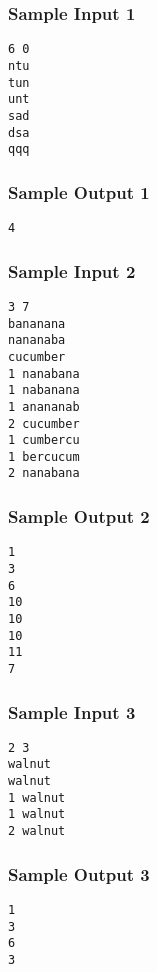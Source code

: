 \subsubsection{Sample Input 1}\label{sample-input-1}
\begin{verbatim}
6 0
ntu
tun
unt
sad
dsa
qqq
\end{verbatim}

\subsubsection{Sample Output 1}\label{sample-output-1}
\begin{verbatim}
4
\end{verbatim}

\subsubsection{Sample Input 2}\label{sample-input-2}
\begin{verbatim}
3 7
bananana
nananaba
cucumber
1 nanabana
1 nabanana
1 anananab
2 cucumber
1 cumbercu
1 bercucum
2 nanabana
\end{verbatim}

\subsubsection{Sample Output 2}\label{sample-output-2}
\begin{verbatim}
1
3
6
10
10
10
11
7
\end{verbatim}

{\color{red}
\subsubsection{Sample Input 3}\label{sample-input-3}
\begin{verbatim}
2 3
walnut
walnut
1 walnut
1 walnut
2 walnut
\end{verbatim}


\subsubsection{Sample Output 3}\label{sample-output-3}
\begin{verbatim}
1
3
6
3
\end{verbatim}
}